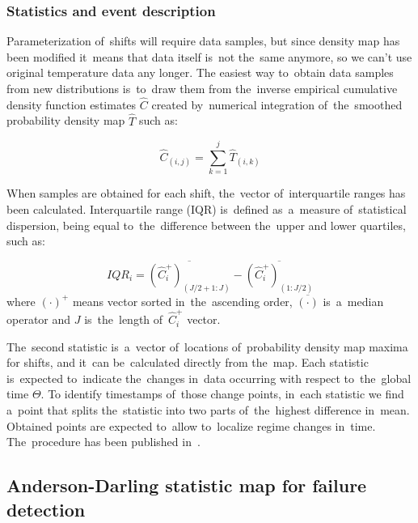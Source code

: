 \subsubsection{Statistics and event description}

Parameterization of~shifts will require data samples, but since density map has been modified it~means that data itself is~not the~same anymore, so we can’t use original temperature data any longer. The easiest way to~obtain data samples from new distributions is~to~draw them from the~inverse empirical cumulative density function estimates $\hat{C}$ created by~numerical integration of~the~smoothed probability density map $\hat{T}$ \cite{devroye1986sample} such as:

\begin{equation}
  \hat{C}_{(i,j)}=\sum_{k=1}^j \hat{T}_{(i,k)}
\end{equation}

When samples are obtained for each shift, the~vector of~interquartile ranges has been calculated. Interquartile range (IQR) is~defined as~a~measure of~statistical dispersion, being equal to~the~difference between the~upper and lower quartiles, such as:

\begin{equation}
  IQR_i=\overline{\left(\hat{C}_i^+\right)_{(J/2+1:J)}}- \overline{\left(\hat{C}_i^+\right)_{(1:J/2)}}
\end{equation}
where $(\cdot)^+$ means vector sorted in~the~ascending order, $\overline{(\cdot)}$ is~a~median operator and $J$ is~the~length of~$\hat{C}_i^+$ vector.

The~second statistic is~a~vector of~locations of~probability density map maxima for shifts, and it~can be~calculated directly from the~map. Each statistic is~expected to~indicate the~changes in~data occurring with respect to~the~global time $\Theta$. To identify timestamps of~those change points, in~each statistic we find a~point that splits the~statistic into two parts of~the~highest difference in~mean. Obtained points are expected to~allow to~localize regime changes in~time. The~procedure has been published in~\cite{wodecki2016condition}.

\subsection{Anderson-Darling statistic map for failure detection}\label{temp_ad}

